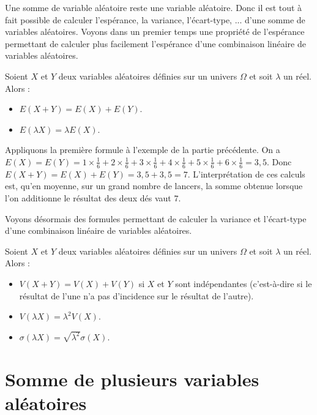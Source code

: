 	Une somme de variable aléatoire reste une variable aléatoire. Donc il est tout à fait possible de calculer l'espérance, la variance, l'écart-type, ... d'une somme de variables aléatoires.
	\newpar
	Voyons dans un premier temps une propriété de l'espérance permettant de calculer plus facilement l'espérance d'une combinaison linéaire de variables aléatoires.

	\begin{formula}
		Soient $X$ et $Y$ deux variables aléatoires définies sur un univers $\Omega$ et soit $\lambda$ un réel. Alors :
		\begin{itemize}
			\item $E(X + Y) = E(X) + E(Y)$.
			\item $E(\lambda X) = \lambda E(X)$.
		\end{itemize}
	\end{formula}

	\begin{tip}[Applications]
		Appliquons la première formule à l'exemple de la partie précédente.
		\newpar
		On a $E(X) = E(Y) = 1 \times \frac{1}{6} + 2 \times \frac{1}{6} + 3 \times \frac{1}{6} + 4 \times \frac{1}{6} + 5 \times \frac{1}{6} + 6 \times \frac{1}{6} = 3,5$.
		\newpar
		Donc $E(X+Y) = E(X) + E(Y) = 3,5 + 3,5 = 7$.
		\newpar
		L'interprétation de ces calculs est, qu'en moyenne, sur un grand nombre de lancers, la somme obtenue lorsque l'on additionne le résultat des deux dés vaut $7$.
	\end{tip}

	Voyons désormais des formules permettant de calculer la variance et l'écart-type d'une combinaison linéaire de variables aléatoires.

	\begin{formula}
		Soient $X$ et $Y$ deux variables aléatoires définies sur un univers $\Omega$ et soit $\lambda$ un réel. Alors :
		\begin{itemize}
			\item $V(X + Y) = V(X) + V(Y)$ si $X$ et $Y$ sont indépendantes (c'est-à-dire si le résultat de l'une n'a pas d'incidence sur le résultat de l'autre).
			\item $V(\lambda X) = \lambda^2 V(X)$.
			\item $\sigma(\lambda X) = \sqrt{\lambda^2} \sigma(X)$.
		\end{itemize}
	\end{formula}

	\section{Somme de plusieurs variables aléatoires}

